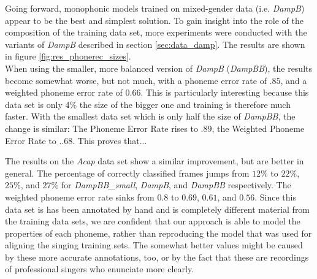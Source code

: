 Going forward, monophonic models trained on mixed-gender data (i.e. \textit{DampB}) appear to be the best and simplest solution. To gain insight into the role of the composition of the training data set, more experiments were conducted with the variants of \textit{DampB} described in section \ref{sec:data_damp}. The results are shown in figure \ref{fig:res_phonerec_sizes}.\\

When using the smaller, more balanced version of \textit{DampB} (\textit{DampBB}), the results become somewhat worse, but not much, with a phoneme error rate of $.85$, and a weighted phoneme error rate of $0.66$. This is particularly interesting because this data set is only 4\% the size of the bigger one and training is therefore much faster. With the smallest data set which is only half the size of \textit{DampBB}, the change is similar: The Phoneme Error Rate rises to $.89$, the Weighted Phoneme Error Rate to $..68$. This proves that...

The results on the \textit{Acap} data set show a similar improvement, but are better in general. The percentage of correctly classified frames jumps from  $12\%$ to $22\%$, $25\%$, and $27\%$ for \textit{DampBB\_small}, \textit{DampB}, and \textit{DampBB} respectively. The weighted phoneme error rate sinks from $0.8$ to $0.69$, $0.61$, and $0.56$. Since this data set is has been annotated by hand and is completely different material from the training data sets, we are confident that our approach is able to model the properties of each phoneme, rather than reproducing the model that was used for aligning the singing training sets. The somewhat better values might be caused by these more accurate annotations, too, or by the fact that these are recordings of professional singers who enunciate more clearly.

